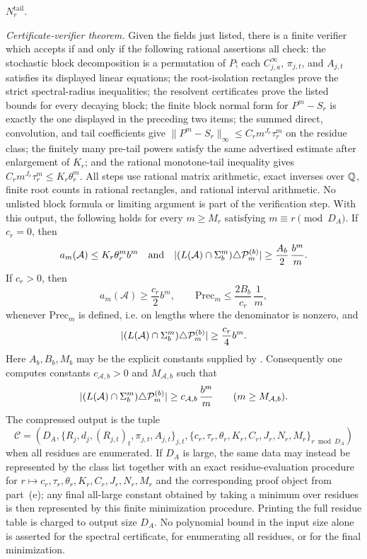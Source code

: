 \begin{theorem}
\begin{enumerate}[label=\textup{(\roman*)}]
    \(N_r^{\mathrm{tail}}\).
  \end{enumerate}
  \smallskip
  \noindent\textit{Certificate-verifier theorem.}
  Given the fields just listed, there is a finite verifier which accepts
  if and only if the following rational assertions all check:
  the stochastic block decomposition is a permutation of \(P\); each
  \(C_{j,a}^{\infty}\), \(\pi_{j,t}\), and \(A_{j,t}\) satisfies its
  displayed linear equations; the root-isolation rectangles prove the
  strict spectral-radius inequalities; the resolvent certificates prove
  the listed bounds for every decaying block; the finite block normal
  form for \(P^m-S_r\) is exactly the one displayed in the preceding
  two items; the summed direct, convolution, and tail coefficients give
  \(\|P^m-S_r\|_\infty\le C_rm^{J_r}\tau_r^m\) on the residue class;
  the finitely many pre-tail powers satisfy the same advertised
  estimate after enlargement of \(K_r\); and the rational monotone-tail
  inequality gives \(C_rm^{J_r}\tau_r^m\le K_r\theta_r^m\). All steps
  use rational matrix arithmetic, exact inverses over \(\mathbb{Q}\), finite
  root counts in rational rectangles, and rational interval arithmetic.
  No unlisted block formula or limiting argument is part of the
  verification step.
  With this output, the following holds for every
  \(m\ge M_r\) satisfying \(m\equiv r\pmod {D_A}\).
  If \(c_r=0\), then
  \[
    a_m(\mathcal A)\le K_r\theta_r^m b^m
    \quad\text{and}\quad
    \lvert (L(\mathcal A)\cap\Sigma_b^m)\triangle\mathcal P_m^{(b)} \rvert
    \ge \frac{A_b}{2}\,\frac{b^m}{m}.
  \]
  If \(c_r>0\), then
  \[
    a_m(\mathcal A)\ge \frac{c_r}{2}b^m,
    \qquad
    \mathrm{Prec}_m\le \frac{2B_b}{c_r}\,\frac1m,
  \]
  whenever \(\mathrm{Prec}_m\) is defined, i.e. on lengths where the
  denominator is nonzero, and
  \[
    \lvert (L(\mathcal A)\cap\Sigma_b^m)\triangle\mathcal P_m^{(b)} \rvert
    \ge \frac{c_r}{4} b^m .
  \]
  Here \(A_b,B_b,M_b\) may be the explicit constants supplied by
  . Consequently
  one computes constants \(c_{\mathcal A,b}>0\) and \(M_{\mathcal A,b}\)
  such that
  \[
    \lvert (L(\mathcal A)\cap\Sigma_b^m)\triangle\mathcal P_m^{(b)} \rvert
    \ge c_{\mathcal A,b}\,\frac{b^m}{m}
    \qquad(m\ge M_{\mathcal A,b}).
  \]
  The compressed output is the tuple
  \[
    \mathcal C=(D_A,\{R_j,d_j,(R_{j,t})_t,\pi_{j,t},A_{j,t}\}_{j,t},
      \{c_r,\tau_r,\theta_r,K_r,C_r,J_r,N_r,M_r\}_{r\bmod D_A})
  \]
  when all residues are enumerated. If \(D_A\) is large, the same data
  may instead be represented by the class list together with an exact
  residue-evaluation procedure for
  \(r\mapsto c_r,\tau_r,\theta_r,K_r,C_r,J_r,N_r,M_r\) and the
  corresponding proof object from part~\textup{(e)};
  any final all-large constant obtained by taking a minimum over
  residues is then represented by this finite minimization procedure.
  Printing the full residue table is charged to output size \(D_A\).
  No polynomial bound in the input size alone is asserted for the
  spectral certificate, for enumerating all residues, or for the final
  minimization.
\end{theorem}

